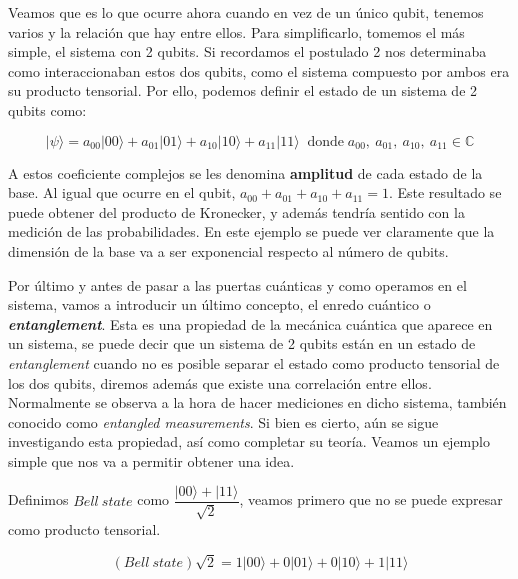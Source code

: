  Veamos que es lo que ocurre ahora cuando en vez de un único qubit, tenemos varios y la relación que hay entre ellos. Para simplificarlo, tomemos el más simple, el sistema con 2 qubits. Si recordamos el postulado 2 nos determinaba como interaccionaban estos dos qubits, como el sistema compuesto por ambos era su producto tensorial. Por ello, podemos definir el estado de un sistema de 2 qubits como:

    \begin{equation*}|\psi\rangle = a_{00}|00\rangle + a_{01}|01\rangle + a_{10}|10\rangle + a_{11}|11\rangle \;\;\text{donde}\; a_{00},\: a_{01}, \:a_{10}, \:a_{11} \in \mathbb{C}
    \end{equation*}

 A estos coeficiente complejos se les denomina \textbf{amplitud} de cada estado de la base. Al igual que ocurre en el qubit, $a_{00}+a_{01}+a_{10}+a_{11}=1$. Este resultado se puede obtener del producto de Kronecker, y además tendría sentido con la medición de las probabilidades. En este ejemplo se puede ver claramente que la dimensión de la base va a ser exponencial respecto al número de qubits.\newline
 
 Por último y antes de pasar a las puertas cuánticas y como operamos en el sistema, vamos a introducir un último concepto, el enredo cuántico o \textbf{\textit{entanglement}}. Esta es una propiedad de la mecánica cuántica que aparece en un sistema, se puede decir que un sistema de 2 qubits están en un estado de \textit{entanglement} cuando no es posible separar el estado como producto tensorial de los dos qubits\cite{B:QuantumScientist:2008}, diremos además que existe una correlación entre ellos. Normalmente se observa a la hora de hacer mediciones en dicho sistema, también conocido como \textit{entangled measurements}. Si bien es cierto, aún se sigue investigando esta propiedad, así como completar su teoría\cite{B:Nielsen:2002}.  Veamos un ejemplo simple que nos va a permitir obtener una idea. \newline

 Definimos $Bell\:state $ como $ \dfrac{|00\rangle + |11\rangle}{\sqrt{2}}$, veamos primero que no se puede expresar como producto tensorial. 

 \begin{equation*}
     (Bell\:state)\sqrt{2} = 1|00\rangle+ 0|01\rangle+ 0|10\rangle+ 1|11\rangle
 \end{equation*}
 
 \vspace{3pt}

